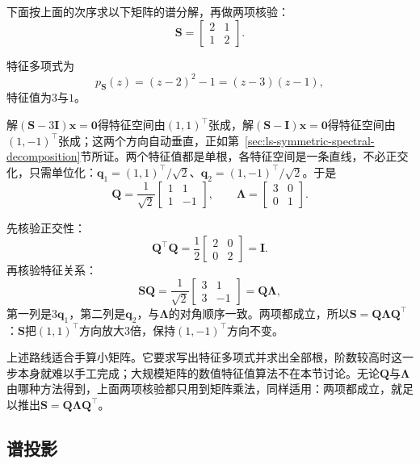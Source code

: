 \begin{example}[二阶对称矩阵的谱分解]
\label{ex:ls-symmetric-spectral-two-by-two}
下面按上面的次序求以下矩阵的谱分解，再做两项核验：
\[
 \bm S=\begin{bmatrix}2&1\\1&2\end{bmatrix}.
\]

特征多项式为
\[
 p_{\bm S}(z)=(z-2)^2-1=(z-3)(z-1),
\]
特征值为$3$与$1$。

解$(\bm S-3\bm I)\bm x=\bm0$得特征空间由$(1,1)^\top$张成，解$(\bm S-\bm I)\bm x=\bm0$得特征空间由$(1,-1)^\top$张成；这两个方向自动垂直，正如第~\ref{sec:ls-symmetric-spectral-decomposition}节所证。两个特征值都是单根，各特征空间是一条直线，不必正交化，只需单位化：$\bm q_1=(1,1)^\top/\sqrt2$、$\bm q_2=(1,-1)^\top/\sqrt2$。于是
\[
 \bm Q=\frac1{\sqrt2}\begin{bmatrix}1&1\\1&-1\end{bmatrix},\qquad
 \bm\Lambda=\begin{bmatrix}3&0\\0&1\end{bmatrix}.
\]

先核验正交性：
\[
 \bm Q^\top\bm Q=\frac12\begin{bmatrix}2&0\\0&2\end{bmatrix}=\bm I .
\]
再核验特征关系：
\[
 \bm S\bm Q=\frac1{\sqrt2}\begin{bmatrix}3&1\\3&-1\end{bmatrix}=\bm Q\bm\Lambda ,
\]
第一列是$3\bm q_1$，第二列是$\bm q_2$，与$\bm\Lambda$的对角顺序一致。两项都成立，所以$\bm S=\bm Q\bm\Lambda\bm Q^\top$：$\bm S$把$(1,1)^\top$方向放大$3$倍，保持$(1,-1)^\top$方向不变。
\end{example}

上述路线适合手算小矩阵。它要求写出特征多项式并求出全部根，阶数较高时这一步本身就难以手工完成；大规模矩阵的数值特征值算法不在本节讨论。无论$\bm Q$与$\bm\Lambda$由哪种方法得到，上面两项核验都只用到矩阵乘法，同样适用：两项都成立，就足以推出$\bm S=\bm Q\bm\Lambda\bm Q^\top$。

\subsection{谱投影}
\label{sec:ls-spectral-projections}

